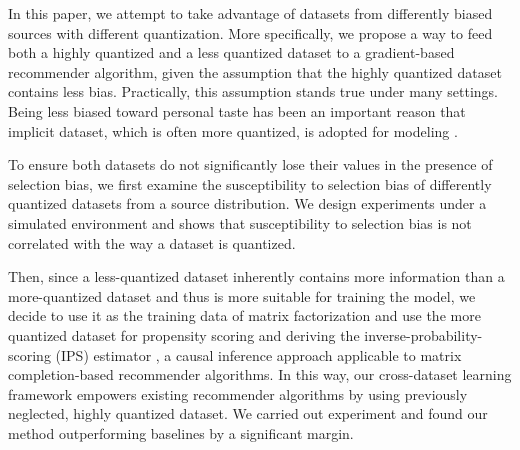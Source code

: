 \documentclass{article}
\begin{document}
In this paper, we attempt to take advantage of datasets from differently biased sources with different quantization. More specifically, we propose a way to feed both a highly quantized and a less quantized dataset to a gradient-based recommender algorithm, given the assumption that the highly quantized dataset contains less bias. Practically, this assumption stands true under many settings. Being less biased toward personal taste has been an important reason that implicit dataset, which is often more quantized, is adopted for modeling \cite{amatriain2009like} \cite{jawaheer2010comparison}.

To ensure both datasets do not significantly lose their values in the presence of selection bias, we first examine the susceptibility to selection bias of differently quantized datasets from a source distribution. We design experiments under a simulated environment and shows that susceptibility to selection bias is not correlated with the way a dataset is quantized. 

Then, since a less-quantized dataset inherently contains more information than a more-quantized dataset \cite{widrow1996statistical} and thus is more suitable for training the model, we decide to use it as the training data of matrix factorization and use the more quantized dataset for propensity scoring and deriving the inverse-probability-scoring (IPS) estimator \cite{thompson2012sampling} \cite{imbens2015causal}, a causal inference approach applicable to matrix completion-based recommender algorithms. In this way, our cross-dataset learning framework empowers existing recommender algorithms by using previously neglected, highly quantized dataset. We carried out experiment and found our method outperforming baselines by a significant margin.

\end{document}
